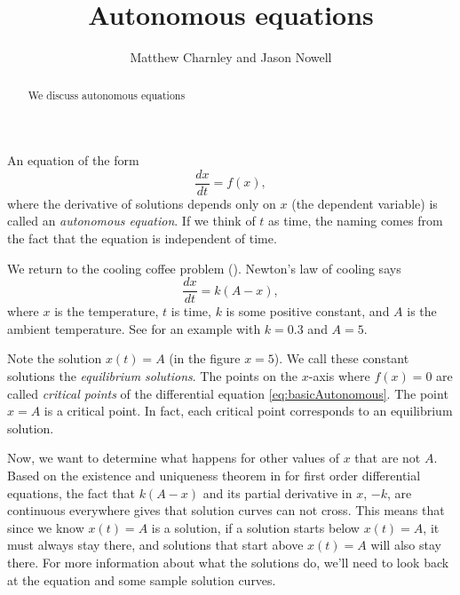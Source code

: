 \documentclass{ximera}
\title{Autonomous equations}
\author{Matthew Charnley and Jason Nowell}
\begin{document}
\begin{abstract}
    We discuss autonomous equations
\end{abstract}
\maketitle

\label{auteq:section}


\begin{definition} \label{def:autonomousEqn}
    An equation of the form
    \begin{equation}
    \frac{dx}{dt} = f(x) , \label{eq:basicAutonomous}
    \end{equation}
    where the derivative of solutions depends only on $x$ (the dependent variable) is called an \emph{autonomous equation}. If we think of $t$ as time, the naming comes from the fact that the equation is independent of time.
\end{definition}

We return to the cooling coffee problem (). Newton's law of cooling says
\begin{equation*}
    \frac{dx}{dt} = k (A-x) ,
\end{equation*}
where $x$ is the temperature, $t$ is time, $k$ is some positive constant, and $A$ is the ambient temperature.  See  for an example with $k=0.3$ and $A=5$.

Note the solution $x(t)=A$ (in the figure $x=5$). We call these constant solutions the \emph{equilibrium solutions}. The points on the $x$-axis where $f(x) = 0$ are called \emph{critical points} of the differential equation \eqref{eq:basicAutonomous}.  The point $x=A$ is a critical point.  In fact, each critical point corresponds to an equilibrium solution.

Now, we want to determine what happens for other values of $x$ that are not $A$. Based on the existence and uniqueness theorem in  for first order differential equations, the fact that $k(A-x)$ and its partial derivative in $x$, $-k$, are continuous everywhere gives that solution curves can not cross. This means that since we know $x(t)=A$ is a solution, if a solution starts below $x(t)=A$, it must always stay there, and solutions that start above $x(t)=A$ will also stay there. For more information about what the solutions do, we'll need to look back at the equation and some sample solution curves.
\end{document}
